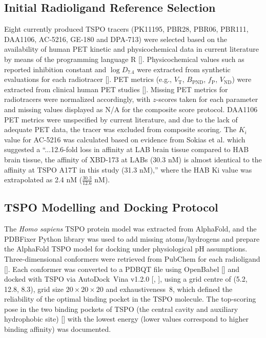 \documentclass[times, twoside]{zHenriquesLab-StyleBioRxiv}
\begin{document}
		\subsection{Initial Radioligand Reference Selection}
		Eight currently produced TSPO tracers (PK11195, PBR28, PBR06, PBR111, DAA1106, AC‑5216, GE‑180 and DPA‑713) were selected based on the availability of human PET kinetic and physicochemical data in current literature by means of the programming language R [\cite{team2025}]. Physicochemical values such as reported inhibition constant and $\log D_{7.4}$ were extracted from synthetic evaluations for each radiotracer [\cite{owen2011, pike2009, sokias2017, wickstrm2014, chau2015, wadsworth2012, imaizumi2008, boutin2007, zhang2021, luu2022}].  PET metrics (e.g., $V_{\mathrm{T}}$, $B_{\mathrm{PND}}$, $f_\mathrm{P}$, $V_{\mathrm{ND}}$) were extracted from clinical human PET studies [\cite{fujita2017, fan2016, miyoshi2009, endresn.d, dickstein2011, owen2014, yn.d}].  Missing PET metrics for radiotracers were normalized accordingly, with $z$-scores taken for each parameter and missing values displayed as N/A for the composite score protocol. DAA1106 PET metrics were unspecified by current literature, and due to the lack of adequate PET data, the tracer was excluded from composite scoring. The $K_{i}$ value for AC-5216 was calculated based on evidence from Sokias et al. which suggested a “...12.6-fold loss in affinity at LAB brain tissue compared to HAB brain tissue, the affinity of XBD-173 at LABs (30.3 nM) is almost identical to the affinity at TSPO A17T in this study (31.3 nM),” where the HAB Ki value was extrapolated as 2.4 nM ($\frac{30.3}{12.6}$ nM). 
		
		
		\subsection{TSPO Modelling and Docking Protocol}
		The \textit{Homo sapiens} TSPO protein model was extracted from AlphaFold, and the PDBFixer Python library was used to add missing atoms/hydrogens and prepare the AlphaFold TSPO model for docking under physiological pH assumptions. Three‑dimensional conformers were retrieved from PubChem for each radioligand [\cite{information2025, information2026, information2026b, information2026c, information2026d, information2026e, information2026f, information2026g, information2026h}].  Each conformer was converted to a PDBQT file using OpenBabel [\cite{oboyle2011}] and docked with TSPO via AutoDock~Vina v1.2.0 [\cite{trott2010}, \cite{eberhardt2021}], using a grid centre of (5.2, 12.8, 8.3), grid size $20\times20\times20$ and exhaustiveness~8, which defined the reliability of the optimal binding pocket in the TSPO molecule.  The top‑scoring pose in the two binding pockets of TSPO (the central cavity and auxiliary hydrophobic site) [\cite{riond1991}] with the lowest energy (lower values correspond to higher binding affinity) was documented. 
		
\end{document}
